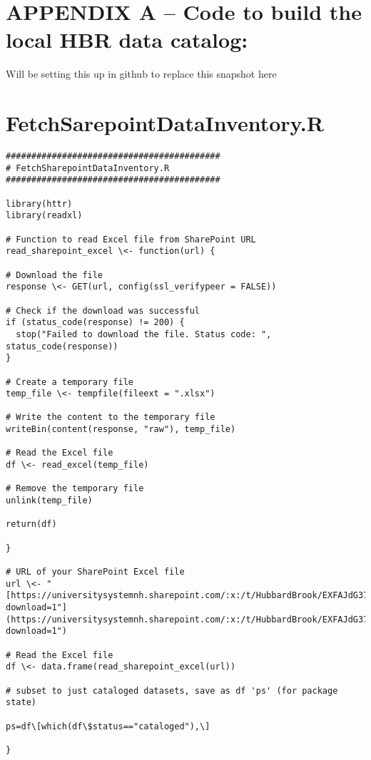 \documentclass[
  letterpaper,
  DIV=11,
  numbers=noendperiod]{scrreprt}
\begin{document}
\section{APPENDIX A -- Code to build the local HBR data
catalog:}\label{appendix-a-code-to-build-the-local-hbr-data-catalog}

Will be setting this up in github to replace this snapshot here

\section{FetchSarepointDataInventory.R}\label{fetchsarepointdatainventory.r}

\begin{verbatim}
##########################################
# FetchSharepointDataInventory.R
########################################## 

library(httr)
library(readxl)

# Function to read Excel file from SharePoint URL
read_sharepoint_excel \<- function(url) {

# Download the file
response \<- GET(url, config(ssl_verifypeer = FALSE))

# Check if the download was successful
if (status_code(response) != 200) {
  stop("Failed to download the file. Status code: ", status_code(response))
}

# Create a temporary file
temp_file \<- tempfile(fileext = ".xlsx")

# Write the content to the temporary file
writeBin(content(response, "raw"), temp_file)

# Read the Excel file
df \<- read_excel(temp_file)

# Remove the temporary file
unlink(temp_file)

return(df)

}

# URL of your SharePoint Excel file
url \<- "[https://universitysystemnh.sharepoint.com/:x:/t/HubbardBrook/EXFAJdG37VxOsrGI5jMhxmcBc1vTpUnZw1WPtiP3Q5Mc4A?download=1"](https://universitysystemnh.sharepoint.com/:x:/t/HubbardBrook/EXFAJdG37VxOsrGI5jMhxmcBc1vTpUnZw1WPtiP3Q5Mc4A?download=1")

# Read the Excel file
df \<- data.frame(read_sharepoint_excel(url))

# subset to just cataloged datasets, save as df 'ps' (for package
state)

ps=df\[which(df\$status=="cataloged"),\]

}
\end{verbatim}
\end{document}
